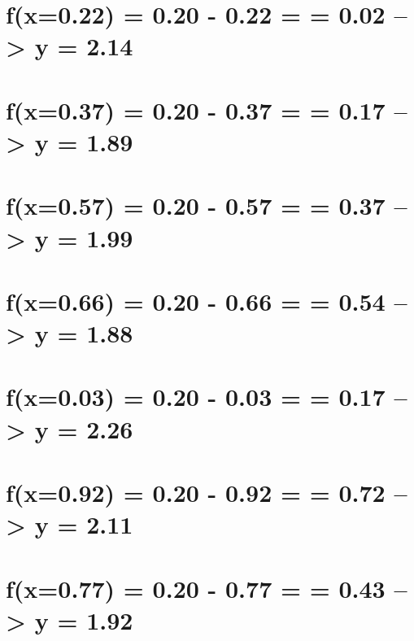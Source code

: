 \documentclass[
  letterpaper,
  DIV=11,
  numbers=noendperiod]{scrreprt}
\begin{document}
{\chapter{f(x=0.22) = 0.20 - 0.22 = \textbar{} = 0.02
--\textgreater{} y = 2.14}\label{fx0.22-0.20---0.22--0.02-0.02-y-2.14}


\chapter{f(x=0.37) = 0.20 - 0.37 = \textbar{} = 0.17
--\textgreater{} y = 1.89}\label{fx0.37-0.20---0.37--0.17-0.17-y-1.89}


\chapter{f(x=0.57) = 0.20 - 0.57 = \textbar{} = 0.37
--\textgreater{} y = 1.99}\label{fx0.57-0.20---0.57--0.37-0.37-y-1.99}


\chapter{f(x=0.66) = 0.20 - 0.66 = \textbar{} = 0.54
--\textgreater{} y = 1.88}\label{fx0.66-0.20---0.66--0.54-0.54-y-1.88}


\chapter{f(x=0.03) = 0.20 - 0.03 = \textbar{} = 0.17
--\textgreater{} y = 2.26}\label{fx0.03-0.20---0.03-0.17-0.17-y-2.26}


\chapter{f(x=0.92) = 0.20 - 0.92 = \textbar{} = 0.72
--\textgreater{} y = 2.11}\label{fx0.92-0.20---0.92--0.72-0.72-y-2.11}


\chapter{f(x=0.77) = 0.20 - 0.77 = \textbar{} = 0.43
--\textgreater{} y = 1.92}\label{fx0.77-0.20---0.77--0.43-0.43-y-1.92}

}
\end{document}
